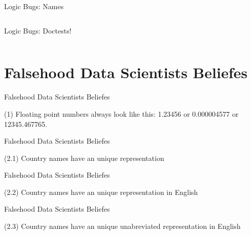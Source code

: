 \documentclass{beamer}
\begin{document}
\begin{frame}{Logic Bugs: Names}
\inputminted[linenos,
             numbersep=7pt,
             fontsize=\footnotesize, tabsize=4,
             firstline=4]{python}{src/sieve-v2.py}
\end{frame}

\begin{frame}{Logic Bugs: Doctests!}
\inputminted[linenos,
               numbersep=7pt,
                fontsize=\footnotesize, tabsize=4,
                firstline=8, lastline=24]{python}{src/sieve-v3.py}
\end{frame}


\section{Falsehood Data Scientists Beliefes}
\begin{frame}{Falsehood Data Scientists Beliefes}
\begin{centering}
(1) Floating point numbers always look like this: 1.23456 or 0.000004577 or 12345.467765.
\end{centering}

\end{frame}

\begin{frame}{Falsehood Data Scientists Beliefes}
\begin{centering}
(2.1) Country names have an unique representation
\end{centering}

\end{frame}

\begin{frame}{Falsehood Data Scientists Beliefes}
\begin{centering}
(2.2) Country names have an unique representation in English
\end{centering}

\end{frame}

\begin{frame}{Falsehood Data Scientists Beliefes}
\begin{centering}
(2.3) Country names have an unique unabreviated representation in English
\end{centering}

\end{frame}
\end{document}
